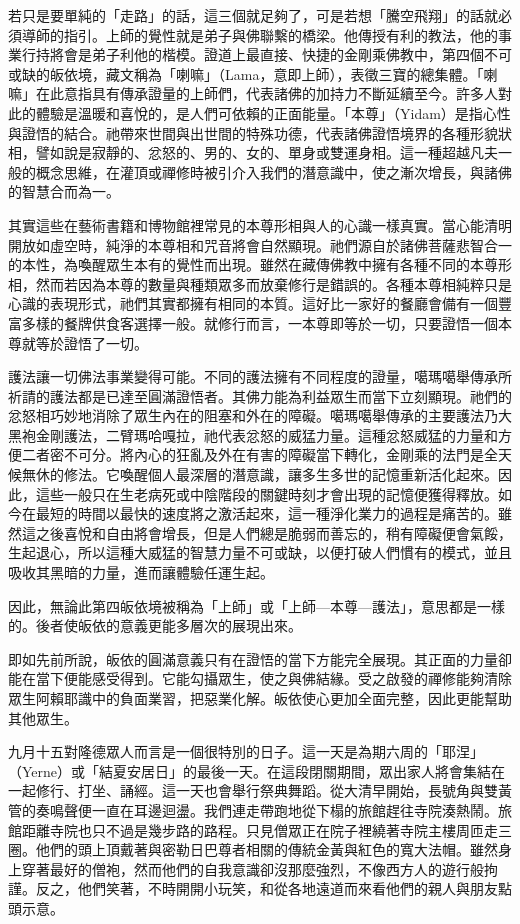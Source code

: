 若只是要單純的「走路」的話，這三個就足夠了，可是若想「騰空飛翔」的話就必須導師的指引。上師的覺性就是弟子與佛聯繫的橋梁。他傳授有利的教法，他的事業行持將會是弟子利他的楷模。證道上最直接、快捷的金剛乘佛教中，第四個不可或缺的皈依境，藏文稱為「喇嘛」（Lama，意即上師），表徵三寶的總集體。「喇嘛」在此意指具有傳承證量的上師們，代表諸佛的加持力不斷延續至今。許多人對此的體驗是溫暖和喜悅的，是人們可依賴的正面能量。「本尊」（Yidam）是指心性與證悟的結合。祂帶來世間與出世間的特殊功德，代表諸佛證悟境界的各種形貌狀相，譬如說是寂靜的、忿怒的、男的、女的、單身或雙運身相。這一種超越凡夫一般的概念思維，在灌頂或禪修時被引介入我們的潛意識中，使之漸次增長，與諸佛的智慧合而為一。

其實這些在藝術書籍和博物館裡常見的本尊形相與人的心識一樣真實。當心能清明開放如虛空時，純淨的本尊相和咒音將會自然顯現。祂們源自於諸佛菩薩悲智合一的本性，為喚醒眾生本有的覺性而出現。雖然在藏傳佛教中擁有各種不同的本尊形相，然而若因為本尊的數量與種類眾多而放棄修行是錯誤的。各種本尊相純粹只是心識的表現形式，祂們其實都擁有相同的本質。這好比一家好的餐廳會備有一個豐富多樣的餐牌供食客選擇一般。就修行而言，一本尊即等於一切，只要證悟一個本尊就等於證悟了一切。

護法讓一切佛法事業變得可能。不同的護法擁有不同程度的證量，噶瑪噶舉傳承所祈請的護法都是已達至圓滿證悟者。其佛力能為利益眾生而當下立刻顯現。祂們的忿怒相巧妙地消除了眾生內在的阻塞和外在的障礙。噶瑪噶舉傳承的主要護法乃大黑袍金剛護法，二臂瑪哈嘎拉，祂代表忿怒的威猛力量。這種忿怒威猛的力量和方便二者密不可分。將內心的狂亂及外在有害的障礙當下轉化，金剛乘的法門是全天候無休的修法。它喚醒個人最深層的潛意識，讓多生多世的記憶重新活化起來。因此，這些一般只在生老病死或中陰階段的關鍵時刻才會出現的記憶便獲得釋放。如今在最短的時間以最快的速度將之激活起來，這一種淨化業力的過程是痛苦的。雖然這之後喜悅和自由將會增長，但是人們總是脆弱而善忘的，稍有障礙便會氣餒，生起退心，所以這種大威猛的智慧力量不可或缺，以便打破人們慣有的模式，並且吸收其黑暗的力量，進而讓體驗任運生起。

因此，無論此第四皈依境被稱為「上師」或「上師---本尊---護法」，意思都是一樣的。後者使皈依的意義更能多層次的展現出來。

即如先前所說，皈依的圓滿意義只有在證悟的當下方能完全展現。其正面的力量卻能在當下便能感受得到。它能勾攝眾生，使之與佛結緣。受之啟發的禪修能夠清除眾生阿賴耶識中的負面業習，把惡業化解。皈依使心更加全面完整，因此更能幫助其他眾生。

九月十五對隆德眾人而言是一個很特別的日子。這一天是為期六周的「耶涅」（Yerne）或「結夏安居日」的最後一天。在這段閉關期間，眾出家人將會集結在一起修行、打坐、誦經。這一天也會舉行祭典舞蹈。從大清早開始，長號角與雙黃管的奏鳴聲便一直在耳邊迴盪。我們連走帶跑地從下榻的旅館趕往寺院湊熱鬧。旅館距離寺院也只不過是幾步路的路程。只見僧眾正在院子裡繞著寺院主樓周匝走三圈。他們的頭上頂戴著與密勒日巴尊者相關的傳統金黃與紅色的寬大法帽。雖然身上穿著最好的僧袍，然而他們的自我意識卻沒那麼強烈，不像西方人的遊行般拘謹。反之，他們笑著，不時開開小玩笑，和從各地遠道而來看他們的親人與朋友點頭示意。

